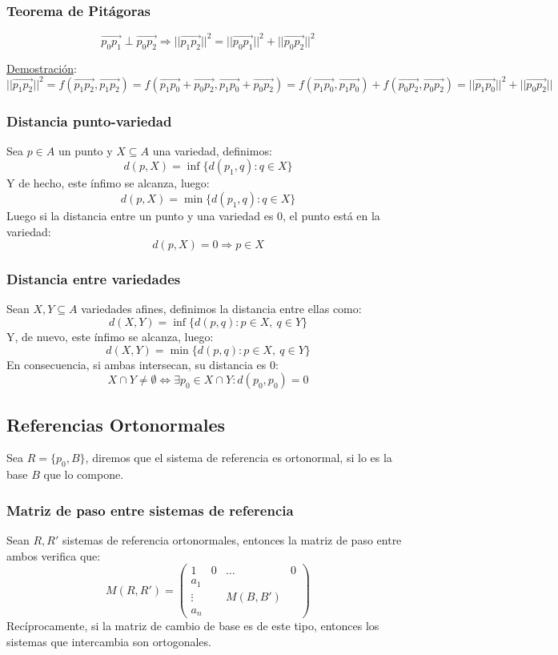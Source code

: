 \documentclass[10pt,a4paper,openright]{book}
\theoremstyle{break}
\begin{document}
\subsubsection*{Teorema de Pitágoras}
$$\vec{p_0p_1}\perp \vec{p_0p_2}\Rightarrow ||\vec{p_1p_2}||^2 = ||\vec{p_0p_1}||^2 + ||\vec{p_0p_2}||^2$$

\underline{Demostración}:
$$||\vec{p_1p_2}|| ^2 = f(\vec{p_1p_2}, \vec{p_1p_2}) = f(\vec{p_1p_0}+\vec{p_0p_2}, \vec{p_1p_0}+\vec{p_0p_2}) = f (\vec{p_1p_0}, \vec{p_1p_0}) + f(\vec{p_0p_2}, \vec{p_0p_2}) = ||\vec{p_1p_0}||^2 + ||\vec{p_0p_2}||$$

\subsubsection*{Distancia punto-variedad}
Sea $p\in A$ un punto y $X\subseteq A$ una variedad, definimos:
$$d(p,X) = \inf\{d(p_1,q) : q\in X\}$$
Y de hecho, este ínfimo se alcanza, luego:
$$d(p,X) = \min\{d(p_1,q) : q\in X\}$$
Luego si la distancia entre un punto y una variedad es 0, el punto está en la variedad:
$$d(p,X) = 0 \Rightarrow p\in X$$

\subsubsection*{Distancia entre variedades}
Sean $X, Y\subseteq A$ variedades afines, definimos la distancia entre ellas como:
$$d(X,Y) = \inf\{d(p,q) : p\in X, \ q\in Y \}$$
Y, de nuevo, este ínfimo se alcanza, luego:
$$d(X,Y) = \min\{d(p,q) : p\in X, \ q\in Y \}$$
En consecuencia, si ambas intersecan, su distancia es 0:
$$X\cap Y \neq \emptyset \Leftrightarrow \exists p_0 \in X \cap Y: d(p_0,p_0) = 0$$

\subsection{Referencias Ortonormales}
Sea $R = \{p_0, B\}$, diremos que el sistema de referencia es ortonormal, si lo es la base $B$ que lo compone.

\subsubsection*{Matriz de paso entre sistemas de referencia}
Sean $R, R'$ sistemas de referencia ortonormales, entonces la matriz de paso entre ambos verifica que:
$$ M (R, R') = \left(\begin{array}{c|ccc}
1& 0 & \ldots & 0 \\
\hline
a_1 & & &   \\
\vdots & & M(B,B') & \\
a_n & & &
\end{array}
\right)$$
Recíprocamente, si la matriz de cambio de base es de este tipo, entonces los sistemas que intercambia son ortogonales.
\end{document}
